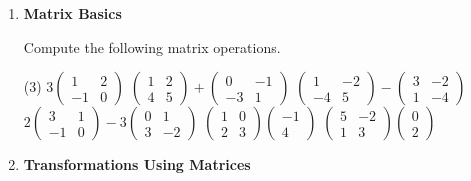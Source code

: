 \begin{enumerate}
\item \textbf{Matrix Basics} 

Compute the following matrix operations.
\begin{tasks}[after-skip = 60pt, after-item-skip = 60pt](3)
\task $3 \begin{pmatrix} 1 & 2 \\ -1 & 0 \end{pmatrix}$
\task $\begin{pmatrix} 1 & 2 \\ 4 & 5 \end{pmatrix} + \begin{pmatrix} 0 & -1 \\ -3 & 1 \end{pmatrix}$
\task $\begin{pmatrix} 1 & -2 \\ -4 & 5 \end{pmatrix} - \begin{pmatrix} 3 & -2 \\ 1 & -4 \end{pmatrix}$
\task $2 \begin{pmatrix} 3 & 1 \\ -1 & 0 \end{pmatrix} - 3 \begin{pmatrix} 0 & 1 \\ 3 & -2 \end{pmatrix}$
\task $\begin{pmatrix} 1 & 0 \\ 2 & 3 \end{pmatrix} \begin{pmatrix} -1 \\ 4 \end{pmatrix}$
\task $\begin{pmatrix} 5 & -2 \\  1 & 3 \end{pmatrix} \begin{pmatrix} 0 \\ 2 \end{pmatrix}$
\end{tasks}


\item \textbf{Transformations Using Matrices} 


\end{enumerate}
